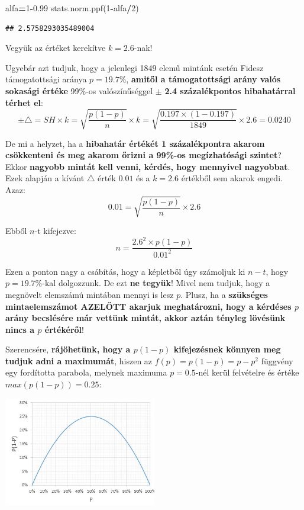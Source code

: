 \documentclass[
]{book}
\newenvironment{Shaded}{\begin{snugshade}}{\end{snugshade}}
\newcommand{\DecValTok}[1]{\textcolor[rgb]{0.00,0.00,0.81}{#1}}
\newcommand{\FloatTok}[1]{\textcolor[rgb]{0.00,0.00,0.81}{#1}}
\newcommand{\NormalTok}[1]{#1}
\newcommand{\OperatorTok}[1]{\textcolor[rgb]{0.81,0.36,0.00}{\textbf{#1}}}
\begin{document}
\begin{Shaded}
\begin{Highlighting}[]
\NormalTok{alfa}\OperatorTok{=}\DecValTok{1}\OperatorTok{{-}}\FloatTok{0.99}
\NormalTok{stats.norm.ppf(}\DecValTok{1}\OperatorTok{{-}}\NormalTok{alfa}\OperatorTok{/}\DecValTok{2}\NormalTok{)}
\end{Highlighting}
\end{Shaded}

\begin{verbatim}
## 2.5758293035489004
\end{verbatim}

Vegyük az értéket kerekítve \(k=2.6\)-nak!

Ugyebár azt tudjuk, hogy a jelenlegi 1849 elemű mintánk esetén Fidesz támogatottsági aránya \(p=19.7\%\), \textbf{amitől a támogatottsági arány valós sokasági értéke} 99\%-os valószínűséggel \(\pm\) \textbf{2.4 százalékpontos hibahatárral térhet el}: \[\pm \triangle = SH \times k = \sqrt{\frac{p(1-p)}{n}} \times k = \sqrt{\frac{0.197 \times (1-0.197)}{1849}} \times 2.6=0.0240\]

De mi a helyzet, ha a \textbf{hibahatár értékét 1 százalékpontra akarom csökkenteni és meg akarom őrizni a 99\%-os megízhatósági szintet}? Ekkor \textbf{nagyobb mintát kell venni, kérdés, hogy mennyivel nagyobbat}. Ezek alapján a kívánt \(\triangle\) érték \(0.01\) és a \(k=2.6\) értékből sem akarok engedi. Azaz: \[0.01 = \sqrt{\frac{p(1-p)}{n}} \times 2.6\]

Ebből \(n\)-t kifejezve: \[n=\frac{2.6^2 \times p(1-p)}{0.01^2}\]

Ezen a ponton nagy a csábítás, hogy a képletből úgy számoljuk ki \(n-t\), hogy \(p=19.7\%\)-kal dolgozzunk. De ezt \textbf{ne tegyük}! Mivel nem tudjuk, hogy a megnövelt elemszámú mintában mennyi is lesz \(p\). Plusz, ha a \textbf{szükséges mintaelemszámot AZELŐTT akarjuk meghatározni, hogy a kérdéses \(p\) arány becslésére már vettünk mintát, akkor aztán tényleg lövésünk nincs a \(p\) értékéről}!

Szerencsére, \textbf{rájöhetünk, hogy a \(p(1-p)\) kifejezésnek könnyen meg tudjuk adni a maximumát}, hiszen az \(f(p)=p(1-p)=p-p^2\) függvény egy fordította parabola, melynek maximuma \(p=0.5\)-nél kerül felvételre és értéke \(max(p(1-p))=0.25\):

\includegraphics[width=0.5\textwidth,height=\textheight]{p_SH.jpg}
\end{document}
